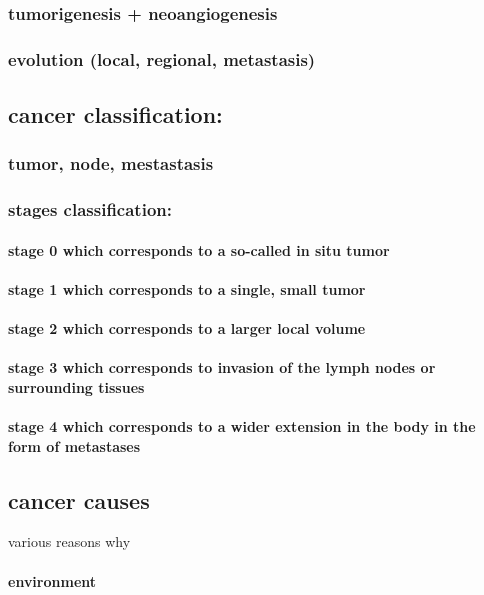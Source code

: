 \subsubsection{tumorigenesis + neoangiogenesis}
\subsubsection{evolution (local, regional, metastasis)}

\subsection{cancer classification:}
\subsubsection{tumor, node, mestastasis}
\subsubsection{stages classification:}
\paragraph{stage 0 which corresponds to a so-called in situ tumor}
\paragraph{stage 1 which corresponds to a single, small tumor}
\paragraph{stage 2 which corresponds to a larger local volume}
\paragraph{stage 3 which corresponds to invasion of the lymph nodes or surrounding tissues}
\paragraph{stage 4 which corresponds to a wider extension in the body in the form of metastases}

\subsection{cancer causes}
various reasons why
\paragraph{environment}
